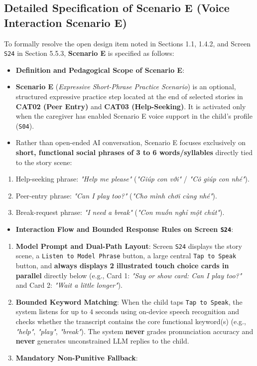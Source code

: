 \subsection{Detailed Specification of Scenario E (Voice Interaction Scenario E)}


To formally resolve the open design item noted in Sections 1.1, 1.4.2, and Screen \texttt{S24} in Section 5.5.3, \textbf{Scenario E} is specified as follows:

\begin{itemize}
  \item \textbf{Definition and Pedagogical Scope of Scenario E}:
  \item \textbf{Scenario E} (\textit{Expressive Short-Phrase Practice Scenario}) is an optional, structured expressive practice step located at the end of selected stories in \textbf{CAT02 (Peer Entry)} and \textbf{CAT03 (Help-Seeking)}. It is activated only when the caregiver has enabled Scenario E voice support in the child's profile (\texttt{S04}).
  \item Rather than open-ended AI conversation, Scenario E focuses exclusively on \textbf{short, functional social phrases of 3 to 6 words/syllables} directly tied to the story scene:
\end{itemize}
\begin{enumerate}
  \item Help-seeking phrase: \textit{"Help me please"} (\textit{"Giúp con với"} / \textit{"Cô giúp con nhé"}).
  \item Peer-entry phrase: \textit{"Can I play too?"} (\textit{"Cho mình chơi cùng nhé"}).
  \item Break-request phrase: \textit{"I need a break"} (\textit{"Con muốn nghỉ một chút"}).
\end{enumerate}
\begin{itemize}
  \item \textbf{Interaction Flow and Bounded Response Rules on Screen \texttt{S24}}:
\end{itemize}
\begin{enumerate}
  \item \textbf{Model Prompt and Dual-Path Layout}: Screen \texttt{S24} displays the story scene, a \texttt{Listen to Model Phrase} button, a large central \texttt{Tap to Speak} button, and \textbf{always displays 2 illustrated touch choice cards in parallel} directly below (e.g., Card 1: \textit{"Say or show card: Can I play too?"} and Card 2: \textit{"Wait a little longer"}).
  \item \textbf{Bounded Keyword Matching}: When the child taps \texttt{Tap to Speak}, the system listens for up to \textbf{$4\text{ seconds}$} using on-device speech recognition and checks whether the transcript contains the core functional keyword(s) (e.g., \textit{"help"}, \textit{"play"}, \textit{"break"}). The system \textbf{never} grades pronunciation accuracy and \textbf{never} generates unconstrained LLM replies to the child.
  \item \textbf{Mandatory Non-Punitive Fallback}:
\end{enumerate}

